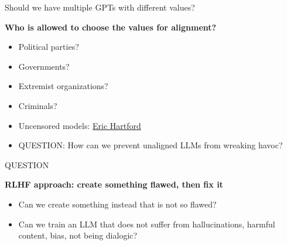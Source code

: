 \begin{vbframe}{Should we have multiple GPTs with different values?}

\vfill

\textbf{Who is allowed to choose the values for alignment?}

	\begin{itemize}
		\item Political parties?
		\item Governments?
		\item Extremist organizations?
                \item Criminals?
                \item Uncensored models:
                \href{https://erichartford.com}{Eric Hartford}
                \item QUESTION: How can we prevent unaligned
		LLMs from wreaking havoc?
	\end{itemize}

\vfill

\end{vbframe}



\begin{vbframe}{QUESTION}

\vfill

\textbf{RLHF approach: create something flawed, then fix it}

	\begin{itemize}
		\item Can we create something instead that
		is not so flawed?
                \item Can we train an LLM that does not
		suffer from hallucinations, harmful content,
		bias, not being dialogic?
	\end{itemize}

\vfill

\end{vbframe}












\endlecture

